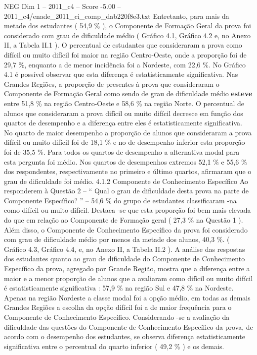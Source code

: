 \begin{textsample}{NEG Dim 1 – 2011\_c4 – Score -5.00 – 2011\_c4/enade\_2011\_ci\_comp\_dab220f8e3.txt}
Entretanto, para mais da metade dos estudantes ( 54,9 \% ), o Componente de Formação Geral da prova foi considerado com grau de dificuldade médio ( Gráfico 4.1, Gráfico 4.2 e, no Anexo II, a Tabela II.1 ).
O percentual de estudantes que consideraram a prova como difícil ou muito difícil foi maior na região Centro-Oeste, onde a proporção foi de 29,7 \%, enquanto a de menor incidência foi a Nordeste, com 22,6 \%.
No Gráfico 4.1 é possível observar que esta diferença é estatisticamente significativa.
Nas Grandes Regiões, a proporção de presentes à prova que consideraram o Componente de Formação Geral como sendo de grau de dificuldade médio \textbf{esteve} entre 51,8 \% na região Centro-Oeste e 58,6 \% na região Norte.
O percentual de alunos que consideraram a prova difícil ou muito difícil decresce em função dos quartos de desempenho e a diferença entre eles é estatisticamente significativa.
No quarto de maior desempenho a proporção de alunos que consideraram a prova difícil ou muito difícil foi de 18,1 \% e no de desempenho inferior esta proporção foi de 35,5 \%.
Para todos os quartos de desempenho a alternativa modal para esta pergunta foi médio.
Nos quartos de desempenhos extremos 52,1 \% e 55,6 \% dos respondentes, respectivamente no primeiro e último quartos, afirmaram que o grau de dificuldade foi médio. 4.1.2 Componente de Conhecimento Específico Ao responderem à Questão 2 – “ Qual o grau de dificuldade desta prova na parte de Componente Específico? ” – 54,6 \% do grupo de estudantes classificaram -na como difícil ou muito difícil.
Destaca -se que esta proporção foi bem mais elevada do que em relação ao Componente de Formação geral ( 27,3 \% na Questão 1 ).
Além disso, o Componente de Conhecimento Específico da prova foi considerado com grau de dificuldade médio por menos da metade dos alunos, 40,3 \%. ( Gráfico 4.3, Gráfico 4.4, e, no Anexo II, a Tabela II.2 ).
A análise das respostas dos estudantes quanto ao grau de dificuldade do Componente de Conhecimento Específico da prova, agregado por Grande Região, mostra que a diferença entre a maior e a menor proporção de alunos que a avaliaram como difícil ou muito difícil é estatisticamente significativa : 57,9 \% na região Sul e 47,8 \% na Nordeste.
Apenas na região Nordeste a classe modal foi a opção médio, em todas as demais Grandes Regiões a escolha da opção difícil foi a de maior frequência para o Componente de Conhecimento Específico.
Considerando -se a avaliação da dificuldade das questões do Componente de Conhecimento Específico da prova, de acordo com o desempenho dos estudantes, se observa diferença estatisticamente significativa entre o percentual do quarto inferior ( 49,2 \% ) e os demais.

\end{textsample}

